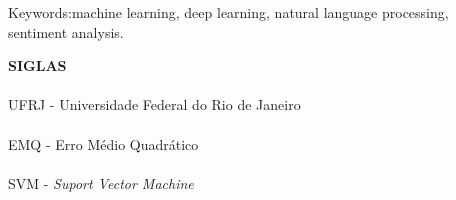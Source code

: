 \noindent Keywords:machine learning, deep learning, natural language processing, sentiment analysis.

\pagebreak

\begin{center}
\textbf{SIGLAS}
\end{center}
\vspace{0.5cm}

\paragraph{}UFRJ - Universidade Federal do Rio de Janeiro
\paragraph{}EMQ - Erro Médio Quadrático
\paragraph{}SVM - \textit{Suport Vector Machine}


\pagebreak
